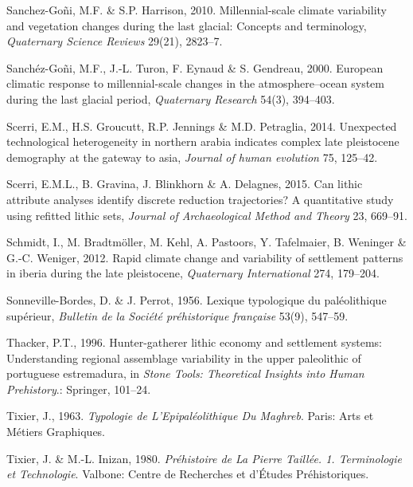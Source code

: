 \documentclass[12pt,twoside]{reedthesis}
\begin{document}
\leavevmode\hypertarget{ref-sanchez-goni2010}{}%
Sanchez-Goñi, M.F. \& S.P. Harrison, 2010. Millennial-scale climate variability and vegetation changes during the last glacial: Concepts and terminology, \emph{Quaternary Science Reviews} 29(21), 2823--7.

\leavevmode\hypertarget{ref-goni2000}{}%
Sanchéz-Goñi, M.F., J.-L. Turon, F. Eynaud \& S. Gendreau, 2000. European climatic response to millennial-scale changes in the atmosphere--ocean system during the last glacial period, \emph{Quaternary Research} 54(3), 394--403.

\leavevmode\hypertarget{ref-scerri2014}{}%
Scerri, E.M., H.S. Groucutt, R.P. Jennings \& M.D. Petraglia, 2014. Unexpected technological heterogeneity in northern arabia indicates complex late pleistocene demography at the gateway to asia, \emph{Journal of human evolution} 75, 125--42.

\leavevmode\hypertarget{ref-scerri2015}{}%
Scerri, E.M.L., B. Gravina, J. Blinkhorn \& A. Delagnes, 2015. Can lithic attribute analyses identify discrete reduction trajectories? A quantitative study using refitted lithic sets, \emph{Journal of Archaeological Method and Theory} 23, 669--91.

\leavevmode\hypertarget{ref-schmidt2012}{}%
Schmidt, I., M. Bradtmöller, M. Kehl, A. Pastoors, Y. Tafelmaier, B. Weninger \& G.-C. Weniger, 2012. Rapid climate change and variability of settlement patterns in iberia during the late pleistocene, \emph{Quaternary International} 274, 179--204.

\leavevmode\hypertarget{ref-sonneville-bordes1956}{}%
Sonneville-Bordes, D. \& J. Perrot, 1956. Lexique typologique du paléolithique supérieur, \emph{Bulletin de la Société préhistorique française} 53(9), 547--59.

\leavevmode\hypertarget{ref-thacker1996}{}%
Thacker, P.T., 1996. Hunter-gatherer lithic economy and settlement systems: Understanding regional assemblage variability in the upper paleolithic of portuguese estremadura, in \emph{Stone Tools: Theoretical Insights into Human Prehistory}.: Springer, 101--24.

\leavevmode\hypertarget{ref-tixier1963}{}%
Tixier, J., 1963. \emph{Typologie de L'Epipaléolithique Du Maghreb}. Paris: Arts et Métiers Graphiques.

\leavevmode\hypertarget{ref-tixier1980}{}%
Tixier, J. \& M.-L. Inizan, 1980. \emph{Préhistoire de La Pierre Taillée. 1. Terminologie et Technologie}. Valbone: Centre de Recherches et d'Études Préhistoriques.
\end{document}
